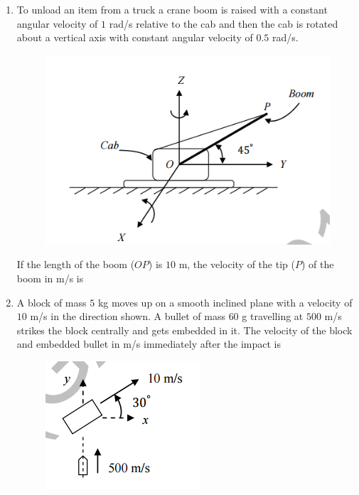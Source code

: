 \documentclass[a4paper,10pt]{article}
\begin{document}
\begin{enumerate}
    \item To unload an item from a truck a crane boom is raised with a constant angular velocity of $1$ rad/s relative to the cab and then the cab is rotated about a vertical axis with constant angular velocity of $0.5$ rad/s.
    \begin{figure}[H] \centering \includegraphics[width=0.6\columnwidth]{q20_solid.png} \caption*{} \label{fig:q20_solid} \end{figure}
    If the length of the boom ($OP$) is $10$ m, the velocity of the tip ($P$) of the boom in m/s is
    
    \hfill{}
    \begin{enumerate}[label=\Alph*)]
    \end{enumerate}

    \item A block of mass $5$ kg moves up on a smooth inclined plane with a velocity of $10$ m/s in the direction shown. A bullet of mass $60$ g travelling at $500$ m/s strikes the block centrally and gets embedded in it. The velocity of the block and embedded bullet in m/s immediately after the impact is
    \begin{figure}[H] \centering \includegraphics[width=0.4\columnwidth]{q21_solid.png} \caption*{} \label{fig:q21_solid} \end{figure}
    

\end{enumerate}
\end{document}
